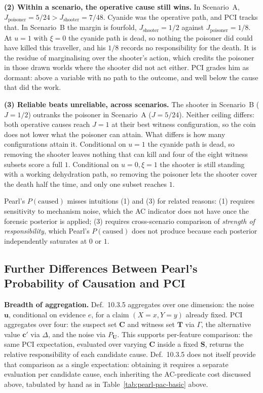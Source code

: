 \textbf{(2) Within a scenario, the operative cause still wins.} In
Scenario~A, $J_{\text{poisoner}} = 5/24 > J_{\text{shooter}} = 7/48$. Cyanide
was the operative path, and PCI tracks that. In Scenario~B the margin is
fourfold, $J_{\text{shooter}} = 1/2$ against $J_{\text{poisoner}} = 1/8$. At
$u=1$ with $\xi=0$ the cyanide path is dead, so nothing the poisoner did could
have killed this traveller, and his $1/8$ records no responsibility for the
death. It is the residue of marginalising over the shooter's action, which
credits the poisoner in those drawn worlds where the shooter did not act
either. PCI grades him as dormant: above a variable with no path to the
outcome, and well below the cause that did the work.

\textbf{(3) Reliable beats unreliable, across scenarios.} The shooter in
Scenario~B ($J = 1/2$) outranks the poisoner in Scenario~A ($J = 5/24$). Neither ceiling
differs: both operative causes reach $J = 1$ at their best witness
configuration, so the coin does not lower what the poisoner can attain. What
differs is how many configurations attain it. Conditional on $u=1$ the cyanide
path is dead, so removing the shooter leaves nothing that can kill and four of
the eight witness subsets score a full $1$. Conditional on $u=0,\xi=1$ the
shooter is still standing with a working dehydration path, so removing the
poisoner lets the shooter cover the death half the time, and only one subset
reaches $1$.

Pearl's $P(\text{caused})$ misses intuitions (1) and (3) for related reasons:
(1) requires sensitivity to mechanism noise, which the AC indicator does not
have once the forensic posterior is applied; (3) requires cross-scenario
comparison of \emph{strength of responsibility}, which Pearl's
$P(\text{caused})$ does not produce because each posterior independently
saturates at $0$ or $1$.


\subsection{Further Differences Between Pearl's Probability of Causation and PCI}


\medskip\noindent\textbf{Breadth of aggregation.}
Def.~10.3.5 aggregates over one dimension: the noise $\mathbf{u}$, conditional on
evidence $e$, for a claim $(X=x, Y=y)$ already fixed. PCI aggregates over four: the
suspect set $\mathbf{C}$ and witness set $\mathbf{T}$ via $\Gamma$, the alternative
value $\mathbf{c}'$ via $\Delta$, and the noise via $P_{\mathbf{U}}$. This supports per-feature comparison: the same PCI expectation, evaluated over varying
$\mathbf{C}$ inside a fixed $\mathbf{S}$, returns the relative responsibility of each
candidate cause. Def.~10.3.5 does not itself provide that comparison as a single expectation:
obtaining it requires a separate evaluation per candidate cause, each inheriting
the AC-predicate cost discussed above, tabulated by hand as in
Table~\ref{tab:pearl-pac-basic} above.


